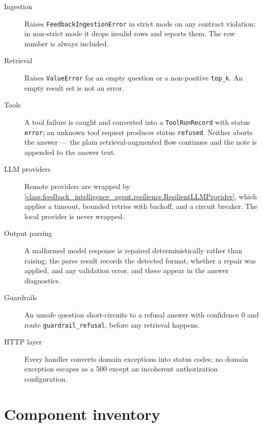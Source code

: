 \begin{description}
  \item[Ingestion] Raises \texttt{FeedbackIngestionError} in strict mode on any
    contract violation; in non-strict mode it drops invalid rows and reports
    them. The row number is always included.
  \item[Retrieval] Raises \texttt{ValueError} for an empty question or a
    non-positive \texttt{top\_k}. An empty result set is not an error.
  \item[Tools] A tool failure is caught and converted into a
    \texttt{ToolRunRecord} with status \texttt{error}; an unknown tool request
    produces status \texttt{refused}. Neither aborts the answer --- the plain
    retrieval-augmented flow continues and the note is appended to the answer
    text.
  \item[LLM providers] Remote providers are wrapped by
    \cref{class:feedback_intelligence_agent.resilience.ResilientLLMProvider},
    which applies a timeout, bounded retries with backoff, and a circuit
    breaker. The local provider is never wrapped.
  \item[Output parsing] A malformed model response is repaired deterministically
    rather than raising; the parse result records the detected format, whether
    a repair was applied, and any validation error, and these appear in the
    answer diagnostics.
  \item[Guardrails] An unsafe question short-circuits to a refusal answer with
    confidence $0$ and route \texttt{guardrail\_refusal}, before any retrieval
    happens.
  \item[HTTP layer] Every handler converts domain exceptions into status codes;
    no domain exception escapes as a 500 except an incoherent authorization
    configuration.
\end{description}



\section{Component inventory}


